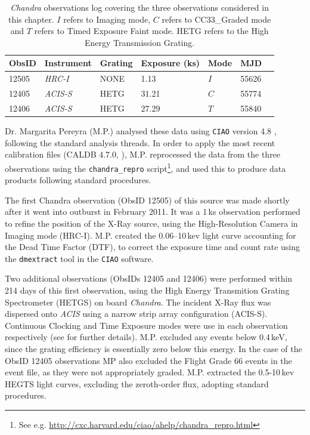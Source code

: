 \begin{table}
\centering
\begin{tabular}{lllllll}
\hline
\hline
\scriptsize ObsID &\scriptsize  Instrument &\scriptsize Grating &\scriptsize Exposure (ks) &\scriptsize  Mode &\scriptsize MJD\\
\hline
12505  	& \textit{HRC-I}    &   NONE      &    1.13      & $I$ & 55626\\
12405  	& \textit{ACIS-S} &   HETG     &    31.21     & $C$ & 55774\\
12406  	& \textit{ACIS-S} &   HETG     &    27.29     & $T$ & 55840\\
\hline
\hline
\end{tabular}
\caption[\textit{Chandra} observations log covering the three observations considered in this chapter.]{\textit{Chandra} observations log covering the three observations considered in this chapter.  $I$ refers to Imaging mode, $C$ refers to CC33\_Graded mode and $T$ refers to Timed Exposure Faint mode.  HETG refers to the High Energy Transmission Grating.}
\label{tab:Chandra}
\end{table}

\par Dr. Margarita Pereyra (\textsf{M.P.}) analysed these data using \texttt{CIAO} version 4.8 \citep{Fruscione_Ciao}, following the standard analysis threads. In order to apply the most recent calibration files (CALDB 4.7.0, \citealp{Graessle_ChaCALDB}), \textsf{M.P.} reprocessed the data from the three observations using the \texttt{chandra\_repro} script\footnote{See e.g. \url{http://cxc.harvard.edu/ciao/ahelp/chandra_repro.html}}, and used this to produce data products following standard procedures.
\par The first Chandra observation (ObsID 12505) of this source was made shortly after it went into outburst in February 2011. It was a 1\,ks observation performed to refine the position of the X-Ray source, using the High-Resolution Camera in Imaging mode (HRC-I). \textsf{M.P.} created the 0.06--10\,kev light curve accounting for the Dead Time Factor (DTF), to correct the exposure time and count rate using the \texttt{dmextract} tool in the \texttt{CIAO} software.
\par Two additional observations (ObsIDs 12405 and 12406) were performed within 214 days of this first observation, using the High Energy Transmition Grating Spectrometer (HETGS) on board \textit{Chandra}. The incident X-Ray flux was dispersed onto \textit{ACIS} using a narrow strip array configuration (ACIS-S). Continuous Clocking and Time Exposure modes were use in each observation respectively (see \citealp{King_IGRWinds} for further details). \textsf{M.P.} excluded any events below 0.4\,keV, since the grating efficiency is essentially zero below this energy. In the case of the ObsID 12405 observations MP also excluded the Flight Grade 66 events in the event file, as they were not appropriately graded. \textsf{M.P.} extracted the 0.5-10\,kev HEGTS light curves, excluding the zeroth-order flux, adopting standard procedures.


